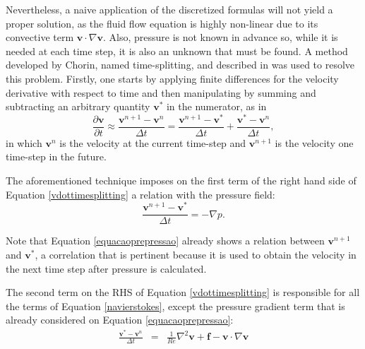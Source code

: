 \documentclass[journal]{IEEEtran}
\begin{document}
Nevertheless, a naive application of the discretized formulas will not yield a proper solution, as the fluid flow equation is highly non-linear due to its convective term $\mathbf{v}\cdot \nabla \mathbf{v}$. Also, pressure is not known in advance so, while it is needed at each time step, it is also an unknown that must be found. A method developed by Chorin, named time-splitting, and described in \cite{Chorin1997118} was used to resolve this problem. Firstly, one starts by applying finite differences for the velocity derivative with respect to time and then manipulating by summing and subtracting an arbitrary quantity $\mathbf{v}^*$ in the numerator, as in \begin{equation}
\frac{\partial \textbf{v}}{\partial t}\approx \frac{\textbf{v}^{n+1}-\textbf{v}^n}{\Delta t}=\frac{\textbf{v}^{n+1}-\textbf{v}^*}{\Delta t}+\frac{\textbf{v}^{*}-\textbf{v}^n}{\Delta t}, \label{vdottimesplitting}
\end{equation} in which $\mathbf{v}^n$ is the velocity at the current time-step and $\mathbf{v}^{n+1}$ is the velocity one time-step in the future.

The aforementioned technique imposes on the first term of the right hand side of Equation \ref{vdottimesplitting} a relation with the pressure field: 
\begin{equation}\frac{\textbf{v}^{n+1}-\textbf{v}^*}{\Delta t}=-\nabla p\label{equacaoprepressao}.\end{equation}

Note that Equation \ref{equacaoprepressao} already shows a relation between $\mathbf{v}^{n+1}$ and $\mathbf{v}^{*}$, a correlation that is pertinent because it is used to obtain the velocity in the next time step after pressure is calculated.


The second term on the RHS of Equation \ref{vdottimesplitting} is responsible for all the terms of Equation \ref{navierstokes}, except the pressure gradient term that is already considered on Equation \ref{equacaoprepressao}: \begin{eqnarray}
\frac{\textbf{v}^{*}-\textbf{v}^n}{\Delta t}&=& \frac{1}{\mathit{Re}}\nabla ^2 \textbf{v} + \textbf{f} - \textbf{v}\cdot \nabla \textbf{v}\label{equacaovestrela}
\end{eqnarray}
\end{document}
